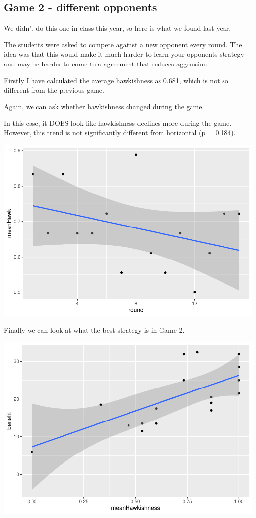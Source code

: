 \documentclass[
  a4paper]{book}
\begin{document}
\subsection{Game 2 - different opponents}\label{game-2---different-opponents}

We didn't do this one in class this year, so here is what we found last year.

The students were asked to compete against a new opponent every round. The idea was that this would make it much harder to learn your opponents strategy and may be harder to come to a agreement that reduces aggression.

Firstly I have calculated the average hawkishness as 0.681, which is not so different from the previous game.

Again, we can ask whether hawkishness changed during the game.

In this case, it DOES look like hawkishness declines more during the game. However, this trend is not significantly different from horizontal (p = 0.184).

\includegraphics{BB512_files/figure-latex/hawkdoveresults9-1.pdf}

Finally we can look at what the best strategy is in Game 2.

\includegraphics{BB512_files/figure-latex/hawkdoveresults10-1.pdf}
\end{document}
